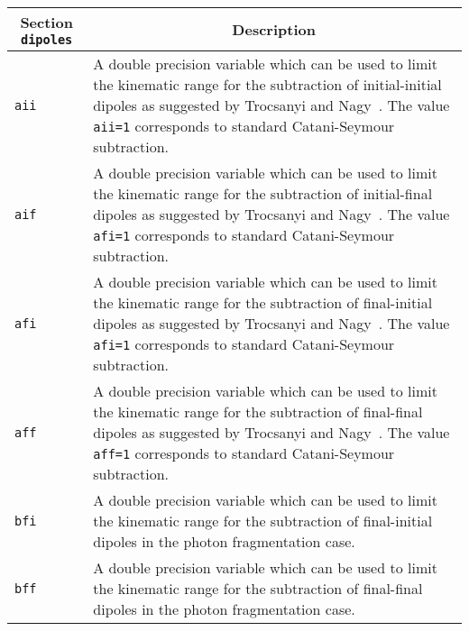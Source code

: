 	\begin{longtable}{p{1.5cm}p{12cm}}
		\hline
		\multicolumn{1}{c}{{\textbf{Section} \texttt{dipoles}}} & \multicolumn{1}{c}{{\textbf{Description}}} \\ 
		\hline
		{\tt aii} &
		A double precision variable which can be used to
		limit the kinematic range for the subtraction of initial-initial dipoles
		as suggested by Trocsanyi and Nagy~\cite{Nagy:2003tz}.   
		The value {\tt aii=1} corresponds 
		to standard Catani-Seymour subtraction.\\
		{\tt aif} &
		A double precision variable which can be used to
		limit the kinematic range for the subtraction of initial-final dipoles
		as suggested by Trocsanyi and Nagy~\cite{Nagy:2003tz}.   
		The value {\tt afi=1} corresponds 
		to standard Catani-Seymour subtraction.\\
		{\tt afi} &
		A double precision variable which can be used to
		limit the kinematic range for the subtraction of final-initial dipoles
		as suggested by Trocsanyi and Nagy~\cite{Nagy:2003tz}.   
		The value {\tt afi=1} corresponds 
		to standard Catani-Seymour subtraction.\\
		{\tt aff} &
		A double precision variable which can be used to
		limit the kinematic range for the subtraction of final-final dipoles
		as suggested by Trocsanyi and Nagy~\cite{Nagy:2003tz}.   
		The value {\tt aff=1} corresponds 
		to standard Catani-Seymour subtraction.\\
		{\tt bfi} &
		A double precision variable which can be used to
		limit the kinematic range for the subtraction of final-initial dipoles
		in the photon fragmentation case.\\
		{\tt bff} &
		A double precision variable which can be used to
		limit the kinematic range for the subtraction of final-final dipoles
		in the photon fragmentation case.\\
		\hline
	\end{longtable}
